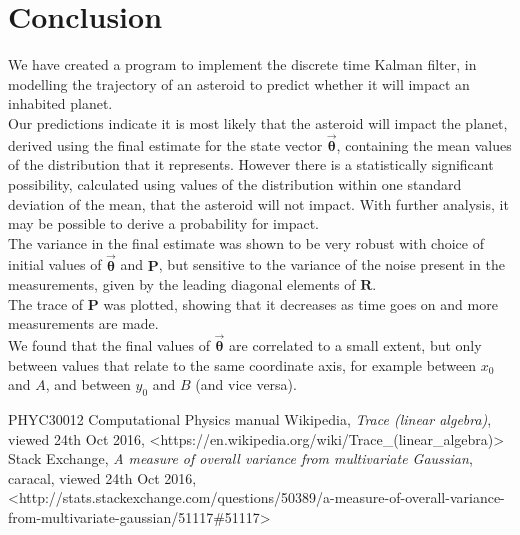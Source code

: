 \documentclass[a4paper]{article}
\begin{document}
\clearpage
\section{Conclusion}
We have created a program to implement the discrete time Kalman filter, in modelling the trajectory of an asteroid to predict whether it will impact an inhabited planet.\\

Our predictions indicate it is most likely that the asteroid will impact the planet, derived using the final estimate for the state vector $\bm{\vec{\theta}}$, containing the mean values of the distribution that it represents. However there is a statistically significant possibility, calculated using values of the distribution within one standard deviation of the mean, that the asteroid will not impact. With further analysis, it may be possible to derive a probability for impact.\\

The variance in the final estimate was shown to be very robust with choice of initial values of $\bm{\vec{\theta}}$ and $\bm{P}$, but sensitive to the variance of the noise present in the measurements, given by the leading diagonal elements of $\bm{R}$.\\

The trace of $\bm{P}$ was plotted, showing that it decreases as time goes on and more measurements are made.\\

We found that the final values of $\bm{\vec{\theta}}$ are correlated to a small extent, but only between values that relate to the same coordinate axis, for example between $x_0$ and $A$, and between $y_0$ and $B$ (and vice versa).

\begin{flushleft}
	\begin{thebibliography}{99}
			PHYC30012 Computational Physics manual
			Wikipedia, \emph{Trace (linear algebra)}, viewed 24th Oct 2016, \textless https://en.wikipedia.org/wiki/Trace\_(linear\_algebra)\textgreater
			Stack Exchange, \emph{A measure of overall variance from multivariate Gaussian}, caracal, viewed 24th Oct 2016, \textless http://stats.stackexchange.com/questions/50389/a-measure-of-overall-variance-from-multivariate-gaussian/51117\#51117\textgreater
	\end{thebibliography}
\end{flushleft}
\end{document}
